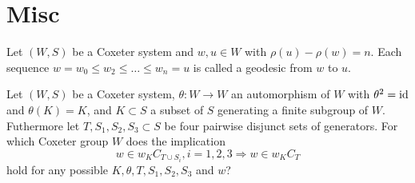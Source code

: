\section{Misc}

\begin{defi}[Geodesic]
Let $(W,S)$ be a Coxeter system and $w,u \in W$ with $\rho(u) - \rho(w) = n$.
Each sequence $w = w_0 \leq w_2 \leq \ldots \leq w_n = u$ is called a geodesic
from $w$ to $u$.
\end{defi}

\begin{ques}
\label{main}
Let $(W,S)$ be a Coxeter system, $\theta : W \to W$ an automorphism of $W$ with
$\theta^2 = \operatorname{id}$ and $\theta(K) = K$, and $K \subset S$ a subset of $S$ generating
a finite subgroup of $W$. Futhermore let $T,S_1,S_2,S_3 \subset S$ be four pairwise
disjunct sets of generators. For which Coxeter group $W$ does the implication
\begin{equation}
\label{main}
w \in w_K C_{T \cup S_i}, i=1,2,3 \Rightarrow w \in w_K C_T
\end{equation}
hold for any possible $K,\theta,T,S_1,S_2,S_3$ and $w$?
\end{ques}

